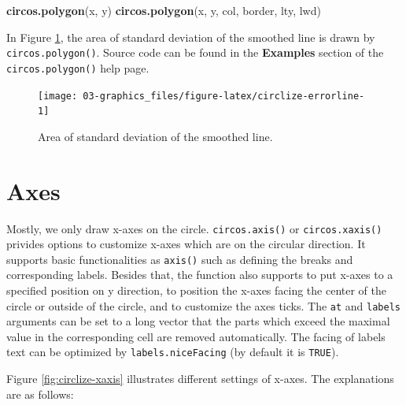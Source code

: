 \documentclass[]{book}
\newenvironment{Shaded}{\begin{snugshade}}{\end{snugshade}}
\newcommand{\KeywordTok}[1]{\textcolor[rgb]{0.13,0.29,0.53}{\textbf{#1}}}
\newcommand{\NormalTok}[1]{#1}
\begin{document}
\begin{Shaded}
\begin{Highlighting}[]
\KeywordTok{circos.polygon}\NormalTok{(x, y)}
\KeywordTok{circos.polygon}\NormalTok{(x, y, col, border, lty, lwd)}
\end{Highlighting}
\end{Shaded}

In Figure \ref{fig:circlize-errorline}, the area of standard deviation
of the smoothed line is drawn by \texttt{circos.polygon()}. Source code
can be found in the \textbf{Examples} section of the
\texttt{circos.polygon()} help page.

\begin{figure}

{\centering \texttt{[image: 03-graphics\_files/figure-latex/circlize-errorline-1]} 

}

\caption{Area of standard deviation of the smoothed line.}\label{fig:circlize-errorline}
\end{figure}

\section{Axes}\label{axes}

Mostly, we only draw x-axes on the circle. \texttt{circos.axis()} or
\texttt{circos.xaxis()} privides options to customize x-axes which are
on the circular direction. It supports basic functionalities as
\texttt{axis()} such as defining the breaks and corresponding labels.
Besides that, the function also supports to put x-axes to a specified
position on y direction, to position the x-axes facing the center of the
circle or outside of the circle, and to customize the axes ticks. The
\texttt{at} and \texttt{labels} arguments can be set to a long vector
that the parts which exceed the maximal value in the corresponding cell
are removed automatically. The facing of labels text can be optimized by
\texttt{labels.niceFacing} (by default it is \texttt{TRUE}).

Figure \ref{fig:circlize-xaxis} illustrates different settings of
x-axes. The explanations are as follows:
\end{document}
